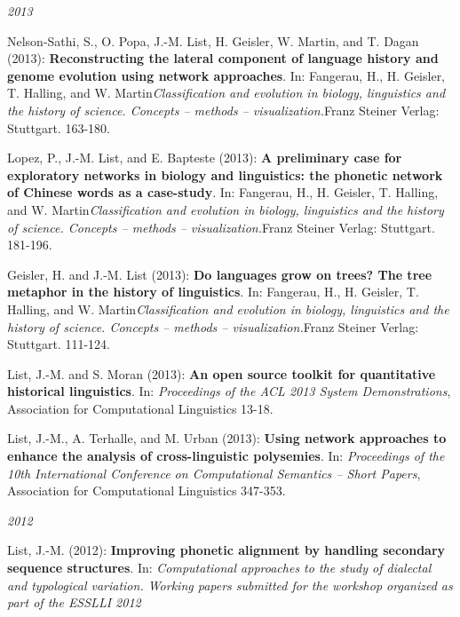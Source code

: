 \noindent\textit{2013}\par\nopagebreak\vspace{0.25cm}
\nopagebreak\noindent Nelson-Sathi, S., O. Popa, J.-M. List, H. Geisler, W. Martin, and T. Dagan (2013): \textbf{Reconstructing the lateral component of language history and genome evolution using network approaches}. In: Fangerau, H., H. Geisler, T. Halling, and W. Martin\textit{Classification and evolution in biology, linguistics and the history of science. Concepts – methods – visualization.}Franz Steiner Verlag: Stuttgart. 163-180.\vspace{0.25cm}
\par
\nopagebreak\noindent Lopez, P., J.-M. List, and E. Bapteste (2013): \textbf{A preliminary case for exploratory networks in biology and linguistics: the phonetic network of Chinese words as a case-study}. In: Fangerau, H., H. Geisler, T. Halling, and W. Martin\textit{Classification and evolution in biology, linguistics and the history of science. Concepts – methods – visualization.}Franz Steiner Verlag: Stuttgart. 181-196.\vspace{0.25cm}
\par
\nopagebreak\noindent Geisler, H. and J.-M. List (2013): \textbf{Do languages grow on trees? The tree metaphor in the history of linguistics}. In: Fangerau, H., H. Geisler, T. Halling, and W. Martin\textit{Classification and evolution in biology, linguistics and the history of science. Concepts – methods – visualization.}Franz Steiner Verlag: Stuttgart. 111-124.\vspace{0.25cm}
\par
\nopagebreak\noindent List, J.-M. and S. Moran (2013): \textbf{An open source toolkit for quantitative historical linguistics}. In: \textit{Proceedings of the ACL 2013 System Demonstrations}, Association for Computational Linguistics 13-18.\vspace{0.25cm}
\par
\nopagebreak\noindent List, J.-M., A. Terhalle, and M. Urban (2013): \textbf{Using network approaches to enhance the analysis of cross-linguistic polysemies}. In: \textit{Proceedings of the 10th International Conference on Computational Semantics -- Short Papers}, Association for Computational Linguistics 347-353.\vspace{0.25cm}
\par
\noindent\textit{2012}\par\nopagebreak\vspace{0.25cm}
\nopagebreak\noindent List, J.-M. (2012): \textbf{Improving phonetic alignment by handling secondary sequence structures}. In: \textit{Computational approaches to the study of dialectal and typological variation. Working papers submitted for the workshop organized as part of the ESSLLI 2012} \vspace{0.25cm}
